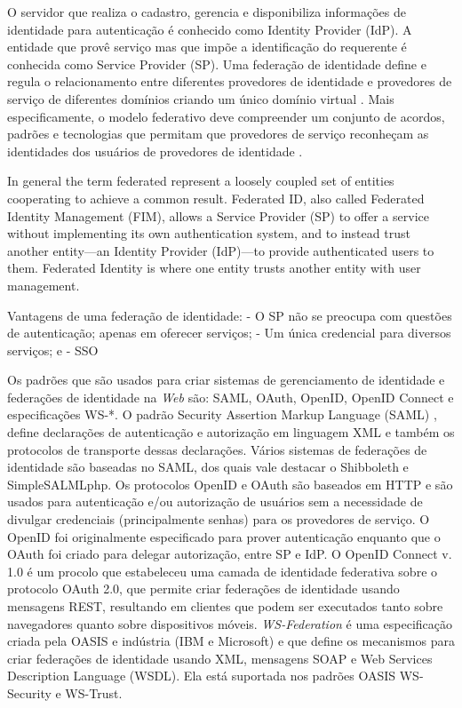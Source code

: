 \documentclass{doublecol-new}
\begin{document}
O servidor que realiza o cadastro, gerencia e disponibiliza informações de identidade para autenticação é conhecido como Identity Provider (IdP). A entidade que provê serviço mas que impõe a identificação do requerente é conhecida como Service Provider (SP). Uma federação de identidade define e regula o relacionamento entre diferentes provedores de identidade e provedores de serviço de diferentes domínios criando um único domínio virtual \cite{perez2014identity} \cite{cao2010survey}. Mais especificamente, o modelo federativo deve compreender um conjunto de acordos, padrões e tecnologias que permitam que provedores de serviço reconheçam as identidades dos usuários de provedores de identidade \cite{torres2013survey}.
	
In general the term federated represent a loosely coupled set of entities cooperating to achieve a common result.
Federated ID, also called Federated Identity Management (FIM), allows a Service Provider (SP) to offer a service without implementing its own authentication system, and to instead trust another entity—an Identity Provider (IdP)—to provide authenticated users to them.
Federated Identity is where one entity trusts another entity with user management.
	
	Vantagens de uma federação de identidade:
	- O SP não se preocupa com questões de autenticação; apenas em oferecer serviços;
	- Um única credencial para diversos serviços; e
	- SSO
	
	
Os padrões que são usados para criar sistemas de gerenciamento de identidade e federações de identidade na \textit{Web} são:  SAML, OAuth, OpenID, OpenID Connect e especificações WS-*. O padrão Security Assertion Markup Language (SAML) \cite{ragouzis2008security}, define declarações de autenticação e autorização em linguagem XML e também os protocolos de transporte dessas declarações. Vários sistemas de federações de identidade são baseadas no SAML, dos quais vale destacar o Shibboleth \cite{erdos2002shibboleth} e SimpleSALMLphp. Os protocolos OpenID\cite{openid2015} e OAuth\cite{hardt2012oauth} são baseados em HTTP e são usados para autenticação e/ou autorização de usuários sem a necessidade de divulgar credenciais (principalmente senhas) para os provedores de serviço. O OpenID foi originalmente especificado para prover autenticação enquanto que o OAuth foi criado para delegar autorização, entre SP e IdP. O OpenID Connect v. 1.0 \cite{sakimura2014openidconnect} é um procolo que estabeleceu uma camada de identidade federativa sobre o protocolo OAuth 2.0, que permite criar federações de identidade usando mensagens REST, resultando em clientes que podem ser executados tanto sobre navegadores quanto sobre dispositivos móveis. \textit{WS-Federation} \cite{goodner2009ws} é uma especificação criada pela OASIS e indústria (IBM e Microsoft) e que define os mecanismos para criar federações de identidade usando XML, mensagens SOAP e Web Services Description Language (WSDL). Ela está suportada nos padrões OASIS WS-Security e WS-Trust.
	
\end{document}
